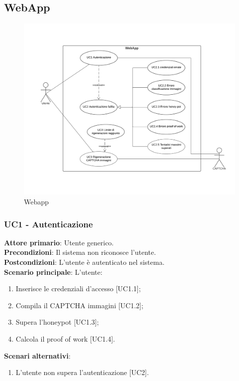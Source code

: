 \subsection{WebApp}

\begin{figure}[H]
    \centering
    \includegraphics[scale=0.4]{img/web_app.png}
    \caption{Webapp}
\end{figure}

\subsubsection{UC1 - Autenticazione}
\textbf{Attore primario}: Utente generico.\\
\textbf{Precondizioni}: Il sistema non riconosce l'utente.\\
\textbf{Postcondizioni}: L'utente è autenticato nel sistema.\\

\textbf{Scenario principale}: L'utente:
\begin{enumerate}
\item Inserisce le credenziali d'accesso [UC1.1];
\item Compila il CAPTCHA immagini [UC1.2];
\item Supera l'honeypot [UC1.3];
\item Calcola il proof of work [UC1.4].
\end{enumerate}

\textbf{Scenari alternativi}:
\begin{enumerate}
    \item L’utente non supera l'autenticazione [UC2].
\end{enumerate}

